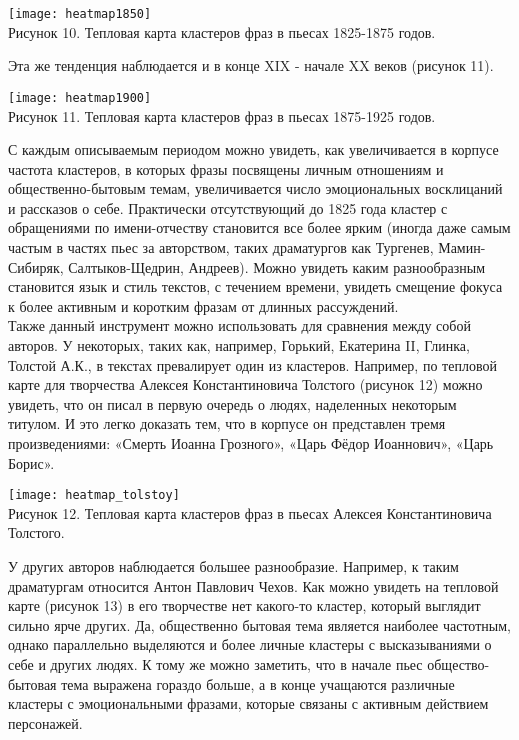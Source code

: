 \documentclass[a4paper,14pt]{article}
\begin{document}
\begin{justify}
\begin{center}
	\texttt{[image: heatmap1850]} \\
	Рисунок 10. Тепловая карта кластеров фраз в пьесах 1825-1875 годов.
\end{center}
Эта же тенденция наблюдается и в конце XIX - начале XX веков (рисунок 11).
\begin{center}
	\texttt{[image: heatmap1900]} \\
	Рисунок 11. Тепловая карта кластеров фраз в пьесах 1875-1925 годов.
\end{center}
\indent
С каждым описываемым периодом можно увидеть, как увеличивается в корпусе частота кластеров, в которых фразы посвящены личным отношениям и общественно-бытовым темам, увеличивается число эмоциональных восклицаний и рассказов о себе. Практически отсутствующий до 1825 года кластер с обращениями по имени-отчеству становится все более ярким (иногда даже самым частым в частях пьес за авторством, таких драматургов как Тургенев, Мамин-Сибиряк, Салтыков-Щедрин, Андреев). Можно увидеть каким разнообразным становится язык и стиль текстов, с течением времени, увидеть смещение фокуса к более активным и коротким фразам от длинных рассуждений.\\
\indent
Также данный инструмент можно использовать для сравнения между собой авторов. У некоторых, таких как, например, Горький, Екатерина II, Глинка, Толстой А.К., в текстах превалирует один из кластеров. Например, по тепловой карте для творчества Алексея Константиновича Толстого (рисунок 12) можно увидеть, что он писал в первую очередь о людях, наделенных некоторым титулом. И это легко доказать тем, что в корпусе он представлен тремя произведениями: «Смерть Иоанна Грозного», «Царь Фёдор Иоаннович», «Царь Борис».
\begin{center}
	\texttt{[image: heatmap\_tolstoy]} \\
	Рисунок 12. Тепловая карта кластеров фраз в пьесах Алексея Константиновича Толстого.
\end{center}
\indent
У других авторов наблюдается большее разнообразие. Например, к таким драматургам относится Антон Павлович Чехов. Как можно увидеть на тепловой карте (рисунок 13) в его творчестве нет какого-то кластер, который выглядит сильно ярче других. Да, общественно бытовая тема является наиболее частотным, однако параллельно выделяются и более личные кластеры с высказываниями о себе и других людях. К тому же можно заметить, что в начале пьес общество-бытовая тема выражена гораздо больше, а в конце учащаются различные кластеры с эмоциональными фразами, которые связаны с активным действием персонажей.

\end{justify}
\end{document}
